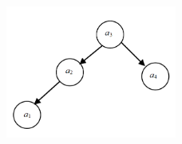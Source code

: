 \documentclass[12pt,a4paper]{article}
\begin{document}
\begin{CJK}{UTF8}{song}
\begin{enumerate}
\begin{figure}[H]
	\end{figure}
	\begin{figure}[H]
	\centering %
	\includegraphics[width=0.5\textwidth]{2(2)} %
\end{figure}
\end{enumerate}




\end{CJK}
\end{document}
